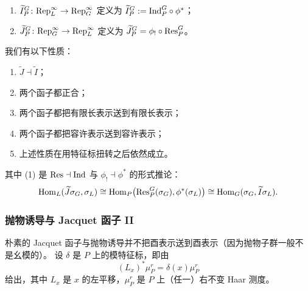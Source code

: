 \begin{definition}
\leavevmode
\begin{enumerate}[label=(\arabic*),leftmargin=2.2em]
\item $\widetilde I^G_P\colon\mathrm{Rep}^{\infty}_L\to\mathrm{Rep}^{\infty}_G$ 定义为 $\widetilde I^G_P:=\mathrm{Ind}^G_P\circ\phi^{*}$；
\item $\widetilde J^G_P\colon\mathrm{Rep}^{\infty}_G\to\mathrm{Rep}^{\infty}_L$ 定义为
      $\widetilde J^G_P=\phi_{!}\circ\mathrm{Res}^G_P$。
\end{enumerate}
\end{definition}

\begin{remark}
我们有以下性质：
\begin{enumerate}[label=(\arabic*),leftmargin=2.2em]
\item $\widetilde J\dashv\widetilde I$；
\item 两个函子都正合；
\item 两个函子都把有限长表示送到有限长表示；
\item 两个函子都把容许表示送到容许表示；
\item 上述性质在用特征标扭转之后依然成立。
\end{enumerate}
其中 (1) 是 $\mathrm{Res}\dashv\mathrm{Ind}$ 与 $\phi_{!}\dashv\phi^{*}$ 的形式推论：
\[
\mathrm{Hom}_L(\widetilde J\sigma_G,\sigma_L)\cong
\mathrm{Hom}_P\bigl(\mathrm{Res}^G_P(\sigma_G),\phi^{*}(\sigma_L)\bigr)\cong
\mathrm{Hom}_G(\sigma_G,\widetilde I\sigma_L).
\]
\end{remark}

\subsubsection{抛物诱导与 Jacquet 函子 II}

朴素的 Jacquet 函子与抛物诱导并不把酉表示送到酉表示（因为抛物子群一般不是幺模的）。
设 $\delta$ 是 $P$ 上的模特征标，即由
\[
(L_x)^{*}\mu^{r}_P=\delta(x)\mu^{r}_P
\]
给出，其中 $L_x$ 是 $x$ 的左平移，$\mu^{r}_P$ 是 $P$ 上（任一）右不变 Haar 测度。

